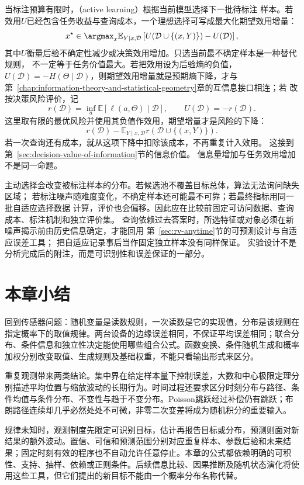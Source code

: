 当标注预算有限时，（active learning）根据当前模型选择下一批待标注
样本。若效用\(U\)已经包含任务收益与查询成本，一个理想选择可写成最大化期望效用增量：
\[
  x^\star\in\argmax_x
  \mathbb{E}_{Y\mid x,\mathcal D}
  \left[
    U(\mathcal D\cup\{(x,Y)\})-U(\mathcal D)
  \right],
\]
其中\(U\)衡量后验不确定性减少或决策效用增加。只选当前最不确定样本是一种替代规则，
不一定等于任务价值最大。若把效用设为后验熵的负值，\(U(\mathcal D)=-H(\Theta\mid\mathcal D)\)，则期望效用增量就是预期熵下降，才与
第~\ref{chap:information-theory-and-statistical-geometry}章的互信息接口相连；若
改按决策风险评价，记
\[
 r(\mathcal D)=\inf_a\mathbb E[\ell(a,\Theta)\mid\mathcal D],
 \qquad U(\mathcal D)=-r(\mathcal D).
\]
这里取有限的最优风险并使用其负值作效用，期望增量才是风险的下降：
\[
 r(\mathcal D)-
 \mathbb E_{Y\mid x,\mathcal D}r(\mathcal D\cup\{(x,Y)\}).
\]
若一次查询还有成本，就从这项下降中扣除该成本，不再重复计入效用。
这接到第~\ref{sec:decision-value-of-information}节的信息价值。
信息量增加与任务效用增加不是同一命题。

主动选择会改变被标注样本的分布。若候选池不覆盖目标总体，算法无法询问缺失区域；
若标注噪声随难度变化，不确定样本还可能最不可靠；若最终指标用同一批自适应选择数据
计算，评价也会偏移。因此应在比较前固定可访问数据、查询成本、标注机制和独立评价集。
查询依赖过去答案时，所选特征或对象必须在新噪声揭示前由历史信息确定，才能回用
第~\ref{sec:rv-anytime}节的可预测设计与自适应误差工具；
把自适应记录事后当作固定独立样本没有同样保证。
实验设计不是分析完成后的附注，而是可识别性和误差保证的一部分。

\section{本章小结}
\label{sec:probability-summary}
\label{sec:stochastic-processes-and-approximation-summary}
\label{sec:statistics-summary}
回到传感器问题：随机变量是读数规则，一次读数是它的实现值，分布是该规则在指定概率下的取值规律。两台设备的边缘误差相同，不保证平均误差相同；联合分布、条件信息和独立性决定能使用哪些组合公式。函数变换、条件随机生成和概率加权分别改变取值、生成规则及基础权重，不能只看输出形式来区分。

重复观测带来两类结论。集中界在给定样本量下控制误差，大数和中心极限定理分别描述平均位置与缩放波动的长期行为。时间过程还要求区分时刻分布与路径、条件均值与条件分布、不变性与趋于不变分布。Poisson跳跃经过补偿仍有跳跃；布朗路径连续却几乎必然处处不可微，非零二次变差将成为随机积分的重要输入。

规律未知时，观测制度先限定可识别目标，估计再报告目标或分布，预测则面对新结果的额外波动。置信、可信和预测范围分别对应重复样本、参数后验和未来结果；固定时刻有效的程序也不自动允许任意停止。本章的公式都依赖明确的可积性、支持、抽样、依赖或正则条件。后续信息比较、因果推断及随机状态演化将使用这些工具，但它们提出的新目标不能由一个概率分布名称代替。
